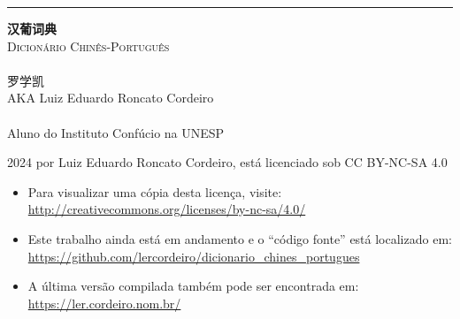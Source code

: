\begin{titlingpage}
  \raggedleft
  \rule{1pt}{\textheight}
  \hspace{0.1\textwidth}
  \parbox[b]{0.75\textwidth}{
    \vspace{0.05\textheight}
    {\HUGE\bfseries 汉葡词典}\\[2\baselineskip] %
    {\Large\textsc{Dicionário Chinês-Português}\\%
     \large\textsc{\zhtoday}}\\%
    [4\baselineskip]
    {\Large\textsc{罗学凯}\\%
     \small AKA Luiz Eduardo Roncato Cordeiro}\\%
    \vspace{0.5\textheight}\\%
    {Aluno do Instituto Confúcio na UNESP}\\[\baselineskip] %
  }
  \newpage
  \raggedright
  \setlength{\parindent}{0pt}
  \setlength{\parskip}{\baselineskip}
  \mbox{}
  \vfill
  \footnotesize
  \textcopyright{} 2024 por Luiz Eduardo Roncato Cordeiro, está licenciado sob CC BY-NC-SA 4.0\\
  \begin{itemize}
    \item Para visualizar uma cópia desta licença, visite:\\ \url{http://creativecommons.org/licenses/by-nc-sa/4.0/}
    \item Este trabalho ainda está em andamento e o ``código fonte'' está localizado em:\\ \url{https://github.com/lercordeiro/dicionario_chines_portugues}
    \item A última versão compilada também pode ser encontrada em:\\ \url{https://ler.cordeiro.nom.br/}
  \end{itemize}
\end{titlingpage}
